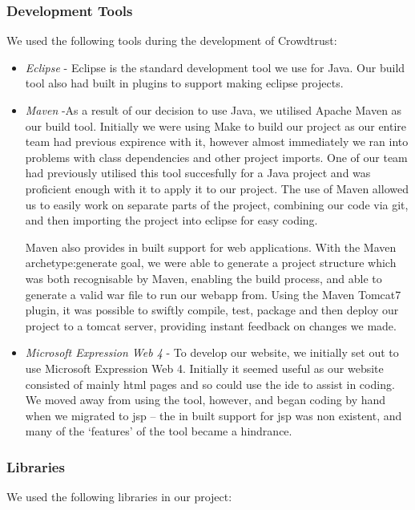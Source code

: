 \documentclass[11pt]{article}
\begin{document}
\subsubsection{Development Tools}
We used the following tools during the development of Crowdtrust:
\begin{itemize}
\item
\emph{Eclipse} - 
Eclipse is the standard development tool we use for Java. Our build tool also
had built in plugins to support making eclipse projects.
\item
\emph{Maven} -As a result of our decision to use Java, we utilised Apache Maven as
our build tool. Initially we were using Make to build our project as our entire team had 
previous expirence with it, however almost immediately we ran into problems with
class dependencies and other project imports. One of our team had previously utilised
this tool succesfully for a Java project and was proficient enough with it to apply
it to our project. The use of Maven allowed us to easily work on separate parts of
the project, combining our code via git, and then importing the project into eclipse
for easy coding.

Maven also provides in built support for web applications. With the Maven archetype:generate
goal, we were able to generate a project structure which was both recognisable by
Maven, enabling the build process, and able to generate a valid war file to run our webapp
from. Using the Maven Tomcat7 plugin, it was possible to swiftly compile, test, package and
then deploy our project to a tomcat server, providing instant feedback on changes we made. 

\item
\emph{Microsoft Expression Web 4} - 
To develop our website, we initially set out to use Microsoft Expression Web 4.
Initially it seemed useful as our website consisted of mainly html pages and so
could use the ide to assist in coding. We moved away from using the tool, however, and began coding by hand
when we migrated to jsp -- the in built support for jsp was non existent, and many
of the `features' of the tool became a hindrance.
\end{itemize}
\subsubsection{Libraries}
We used the following libraries in our project:
\end{document}
